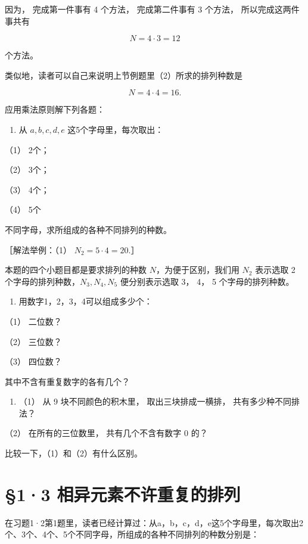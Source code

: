 因为， 完成第一件事有 4 个方法， 完成第二件事有 3 个方法，
所以完成这两件事共有

\[
N = 4 \cdot 3 = 12
\]

个方法。

类似地，读者可以自己来说明上节例题里（2）所求的排列种数是

\[
N = 4 \cdot 4 = 16.
\]

应用乘法原则解下列各题：

\begin{enumerate}
\item
  从 \(a, b, c, d, e\) 这5个字母里，每次取出：
\end{enumerate}

（1） 2个；

（2） 3个；

（3） 4个；

（4） 5个

不同字母，求所组成的各种不同排列的种数。

［解法举例：（1） \(N_{2} = 5\cdot 4 = 20.\)］

 本题的四个小题目都是要求排列的种数
\(N\)，为便于区别，我们用 \(N_{2}\) 表示选取 2
个字母的排列种数，\(N_{3}, N_{4}, N_{5}\) 便分别表示选取 3， 4， 5
个字母的排列种数。

\begin{enumerate}[start=2]
\item
  用数字1，2，3，4可以组成多少个：
\end{enumerate}

（1） 二位数？

（2） 三位数？

（3） 四位数？

其中不含有重复数字的各有几个？

\begin{enumerate}[start=3]
\item
  （1） 从 9 块不同颜色的积木里， 取出三块排成一横排，
  共有多少种不同排法？
\end{enumerate}

（2） 在所有的三位数里， 共有几个不含有数字 0 的？

比较一下，（1）和（2）有什么区别。

\section{§1·3 相异元素不许重复的排列}

在习题1·2第1题里，读者已经计算过：从a，b，c，d，e这5个字母里，每次取出2个、3个、4个、5个不同字母，所组成的各种不同排列的种数分别是：

